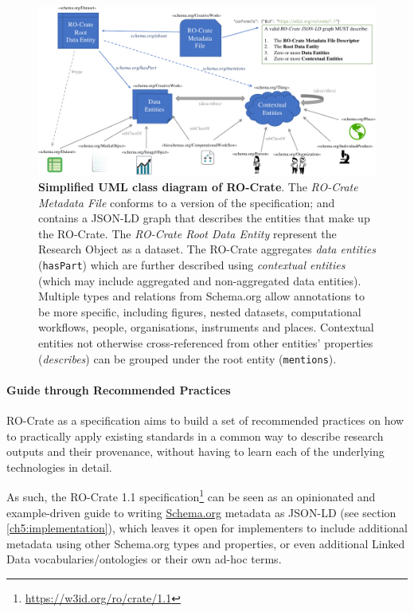 \begin{figure}
\includegraphics[width=\textwidth]{figures/ch05/ro-crate-uml.pdf}
\caption{\textbf{Simplified UML class diagram of RO-Crate}. The 
\emph{RO-Crate Metadata File} conforms to a version of the specification;
and contains a JSON-LD graph \cite{ch5-112} that describes the
entities that make up the RO-Crate. The \emph{RO-Crate Root Data
Entity} represent the Research Object as a dataset. The RO-Crate
aggregates \emph{data entities} (\texttt{hasPart}) which are further
described using \emph{contextual entities} (which may include
aggregated and non-aggregated data entities). Multiple types and
relations from Schema.org allow annotations to be more specific,
including figures, nested datasets, computational workflows, people,
organisations, instruments and places. Contextual entities not
otherwise cross-referenced from other entities' properties 
(\emph{describes}) can be grouped under the root entity (\texttt{mentions}).}
\label{ch5:fig:uml}
\end{figure}

\paragraph{Guide through Recommended
Practices}\label{ch5:recommendedpractices}

RO-Crate as a specification aims to build a set of recommended practices
on how to practically apply existing standards in a common way to
describe research outputs and their provenance, without having to learn
each of the underlying technologies in detail.

As such, the RO-Crate 1.1
specification\footnote{\url{https://w3id.org/ro/crate/1.1}} \cite{ch5-106}
can be seen as an opinionated and example-driven guide to writing
\href{https://schema.org/}{Schema.org}
\cite{ch5-62} metadata as
JSON-LD \cite{ch5-112} (see
section \vref{ch5:implementation}), which
leaves it open for implementers to include additional metadata using
other Schema.org types and properties, or even additional Linked Data
vocabularies/ontologies or their own ad-hoc terms.


